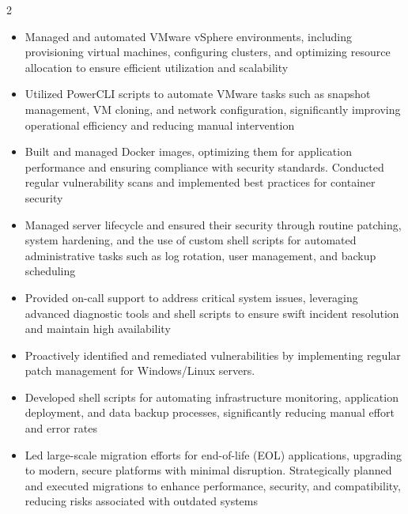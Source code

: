 \documentclass[11pt,a3paper,ragged2e,withhyper]{altacv}
\begin{document}
\begin{paracol}{2}
\newpage

\begin{itemize}
  \item Managed and automated VMware vSphere environments, including provisioning virtual machines, configuring clusters, and optimizing resource allocation to ensure efficient utilization and scalability
  \item Utilized PowerCLI scripts to automate VMware tasks such as snapshot management, VM cloning, and network configuration, significantly improving operational efficiency and reducing manual intervention
  \item Built and managed Docker images, optimizing them for application performance and ensuring compliance with security standards. Conducted regular vulnerability scans and implemented best practices for container security
  \item Managed server lifecycle and ensured their security through routine patching, system hardening, and the use of custom shell scripts for automated administrative tasks such as log rotation, user management, and backup scheduling
  \item Provided on-call support to address critical system issues, leveraging advanced diagnostic tools and shell scripts to ensure swift incident resolution and maintain high availability
  \item Proactively identified and remediated vulnerabilities by implementing regular patch management for Windows/Linux servers. 
  \item Developed shell scripts for automating infrastructure monitoring, application deployment, and data backup processes, significantly reducing manual effort and error rates
  \item Led large-scale migration efforts for end-of-life (EOL) applications, upgrading to modern, secure platforms with minimal disruption. Strategically planned and executed migrations to enhance performance, security, and compatibility, reducing risks associated with outdated systems
\end{itemize}
\divider


\end{paracol}
\end{document}
